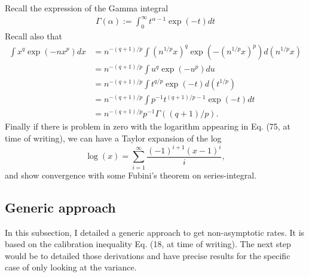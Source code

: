\documentclass{article}
\begin{document}
Recall the expression of the Gamma integral
\begin{align}
  \Gamma(\alpha):=\int_0^\infty t^{\alpha-1} \exp(-t) d t
\end{align}
Recall also that
\begin{align}
    \int x^q \exp(-nx^p) dx
    &= n^{-(q+1)/p} \int (n^{1/p}x)^q \exp(-(n^{1/p}x)^p) d(n^{1/p}x)\\
    &= n^{-(q+1)/p} \int u^q \exp(-u^p) du\\
    &= n^{-(q+1)/p} \int t^{q/p} \exp(-t) d(t^{1/p})\\
    &= n^{-(q+1)/p} \int p^{-1} t^{(q+1)/p - 1} \exp(-t) dt\\
    &= n^{-(q+1)/p} p^{-1} \Gamma((q+1)/p).
\end{align}
Finally if there is problem in zero with the logarithm appearing in Eq. (75, at time of writing), we can have a Taylor expansion of the log 
\[
  \log(x) = \sum_{i=1}^\infty \frac{(-1)^{i+1}(x-1)^i}{i},
\]
and show convergence with some Fubini's theorem on series-integral.

\subsection{Generic approach}

In this subsection, I detailed a generic approach to get non-asymptotic rates.
It is based on the calibration inequality Eq. (18, at time of writing).
The next step would be to detailed those derivations and have precise results for the specific case of only looking at the variance.
\end{document}
